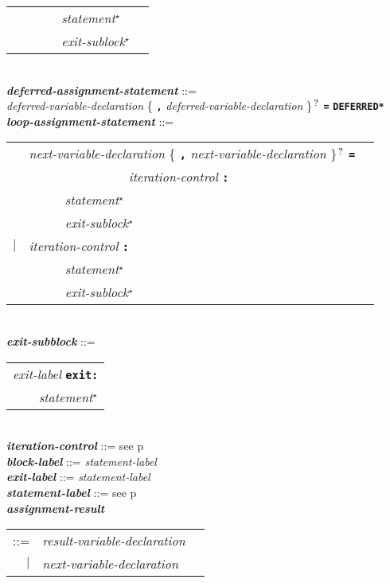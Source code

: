 \documentclass[12pt]{article}
\newcommand{\TT}[1]{{\tt \bfseries #1}}
\newcommand{\STAR}{{\Large $^\star$}}
\newcommand{\QMARK}{{$^{\,\mbox{\footnotesize ?}}$}}
\newcommand{\ttkey}[1]{{\tt \bfseries #1}}
\newcommand{\emkey}[1]{{\em \bfseries #1}}
\newcommand{\pagref}[1]{p\pageref{#1}}
\newenvironment{indpar}[1][0.3in]%
	{\begin{list}{}%
		     {\setlength{\itemsep}{0in}%
		      \setlength{\topsep}{0in}%
		      \setlength{\parsep}{1ex}%
		      \setlength{\labelwidth}{#1}%
		      \setlength{\leftmargin}{#1}%
		      \addtolength{\leftmargin}{\labelsep}}%
	 \item}%
	{\end{list}}
\begin{document}
\begin{indpar}
\begin{tabular}[t]{@{}rll}
        & ~~~~~ {\em statement}\STAR{} \\
        & ~~~~~ {\em exit-sublock}\STAR{} \\
    \end{tabular}
\\[0.5ex]
\emkey{deferred-assignment-statement} ::= \\
\hspace*{0.5in}
        {\em deferred-variable-declaration}
	    \{ \TT{,} {\em deferred-variable-declaration} \}\QMARK{}
	    \TT{=} \ttkey{*DEFERRED*}
\\[0.5ex]
\emkey{loop-assignment-statement} ::= \\
\hspace*{0.5in}
    \begin{tabular}[t]{@{}rll}
        & {\em next-variable-declaration}
                \{ \TT{,} {\em next-variable-declaration} \}\QMARK{}
		\TT{=} \\
	& ~~~~~~~~~~~~~~~ {\em iteration-control} \TT{:} \\
        & ~~~~~ {\em statement}\STAR{} \\
        & ~~~~~ {\em exit-sublock}\STAR{} \\
    $|$ & {\em iteration-control} \TT{:} \\
        & ~~~~~ {\em statement}\STAR{} \\
        & ~~~~~ {\em exit-sublock}\STAR{} \\
    \end{tabular}
\\[0.5ex]
\emkey{exit-subblock} ::=
    \begin{tabular}[t]{l}
    {\em exit-label} \ttkey{exit}\TT{:} \\
    \TT{~~~~}{\em statement}\STAR{} \\
    \end{tabular}
\\[0.5ex]
\emkey{iteration-control} ::= see \pagref{ITERATION-CONTROL}
\\[0.5ex]
\emkey{block-label}\label{BLOCK-LABEL} ::= {\em statement-label}
\\[0.5ex]
\emkey{exit-label} ::= {\em statement-label}
\\[0.5ex]
\emkey{statement-label} ::= see \pagref{STATEMENT-LABEL}
\\[0.5ex]
\emkey{assignment-result}\label{ASSIGNMENT-RESULT}
    \begin{tabular}[t]{@{}rll}
    ::= & {\em result-variable-declaration} \\
    $|$ & {\em next-variable-declaration} \\

\end{tabular}
\end{indpar}
\end{document}
